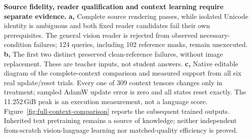 \textbf{Source fidelity, reader qualification and context learning require separate evidence.}
\textbf{a,} Complete source rendering passes, while isolated Unicode identity
is ambiguous and both fixed reader candidates fail their own prerequisites.
The general vision reader is rejected from observed necessary-condition
failures; 124 queries, including 102 reference masks, remain unexecuted.
\textbf{b,} The first two distinct preserved clean-reference failures, without
image replacement. These are teacher inputs, not student answers.
\textbf{c,} Native editable diagram of the complete-context comparison and
measured support from all six real update/reset trials. Every one of 309 context
tensors changes only in treatment; sampled AdamW update error is zero and all
states reset exactly. The 11.252\,GiB peak is an execution measurement, not a
language score. Figure~\ref{fig:full-context-comparison} reports the subsequent trained outputs.
Inherited text pretraining remains a source of knowledge; neither independent
from-scratch vision-language learning nor matched-quality efficiency is proved.
